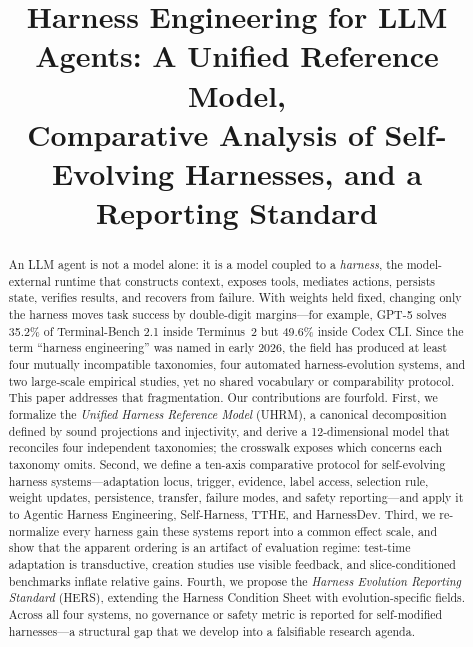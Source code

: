 \documentclass[conference]{IEEEtran}
\begin{document}
\title{Harness Engineering for LLM Agents: A Unified Reference Model,\\
Comparative Analysis of Self-Evolving Harnesses, and a Reporting Standard}

\author{
}

\maketitle

\begin{abstract}
An LLM agent is not a model alone: it is a model coupled to a \emph{harness}, the model-external runtime that constructs context, exposes tools, mediates actions, persists state, verifies results, and recovers from failure. With weights held fixed, changing only the harness moves task success by double-digit margins---for example, GPT-5 solves 35.2\% of Terminal-Bench 2.1 inside Terminus~2 but 49.6\% inside Codex CLI. Since the term ``harness engineering'' was named in early 2026, the field has produced at least four mutually incompatible taxonomies, four automated harness-evolution systems, and two large-scale empirical studies, yet no shared vocabulary or comparability protocol. This paper addresses that fragmentation. Our contributions are fourfold. First, we formalize the \emph{Unified Harness Reference Model} (UHRM), a canonical decomposition defined by sound projections and injectivity, and derive a 12-dimensional model that reconciles four independent taxonomies; the crosswalk exposes which concerns each taxonomy omits. Second, we define a ten-axis comparative protocol for self-evolving harness systems---adaptation locus, trigger, evidence, label access, selection rule, weight updates, persistence, transfer, failure modes, and safety reporting---and apply it to Agentic Harness Engineering, Self-Harness, TTHE, and HarnessDev. Third, we re-normalize every harness gain these systems report into a common effect scale, and show that the apparent ordering is an artifact of evaluation regime: test-time adaptation is transductive, creation studies use visible feedback, and slice-conditioned benchmarks inflate relative gains. Fourth, we propose the \emph{Harness Evolution Reporting Standard} (HERS), extending the Harness Condition Sheet with evolution-specific fields. Across all four systems, no governance or safety metric is reported for self-modified harnesses---a structural gap that we develop into a falsifiable research agenda.
\end{abstract}
\end{document}
